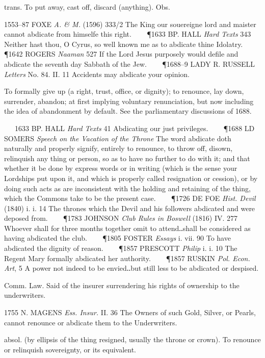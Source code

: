 \begin{description}[wide, labelwidth=!, labelindent=0pt]
\begin{myenumerate}
 trans. To put away, cast off, discard (anything). Obs. 

1553–87 FOXE \textit{A. \& M.} (1596) 333/2 The King our souereigne lord and 
maister cannot abdicate from himselfe this right.    
\P 1633 BP. HALL \textit{Hard Texts} 343 Neither hast thou, O Cyrus, so 
well known me as to abdicate thine Idolatry.    
\P 1642 ROGERS \textit{Naaman} 527 If the Lord Jesus purposely would defile 
and abdicate the seventh day Sabbath of the Jew.    
\P 1688–9 LADY R. RUSSELL \textit{Letters} No. 84. II. 11 Accidents may 
abdicate your opinion.

 To formally give up (a right, trust, office, or dignity); to 
renounce, lay down, surrender, abandon; at first implying voluntary 
renunciation, but now including the idea of abandonment by default. See 
the parliamentary discussions of 1688. 

   1633 BP. HALL \textit{Hard Texts} 41 Abdicating our just privileges.    
\P 1688 LD SOMERS \textit{Speech on the Vacation of the Throne} The word 
abdicate doth naturally and properly signify, entirely to renounce, to 
throw off, disown, relinquish any thing or person, so as to have no further 
to do with it; and that whether it be done by express words or in writing 
(which is the sense your Lordships put upon it, and which is properly called 
resignation or cession), or by doing such acts as are inconsistent with the 
holding and retaining of the thing, which the Commons take to be the present 
case.    
\P 1726 DE FOE \textit{Hist. Devil} (1840) i. i. 14 The thrones which the 
Devil and his followers abdicated and were deposed from.    
\P 1783 JOHNSON \textit{Club Rules in Boswell} (1816) IV. 277 Whoever shall 
for three months together omit to attend‥shall be considered as having 
abdicated the club.    
\P 1805 FOSTER \textit{Essays} i. vii. 90 To have abdicated the dignity of 
reason.    
\P 1857 PRESCOTT \textit{Philip} i. i. 10 The Regent Mary formally abdicated 
her authority.    
\P 1857 RUSKIN \textit{Pol. Econ. Art}, 5 A power not indeed to be envied‥but 
still less to be abdicated or despised.

 Comm. Law. Said of the insurer surrendering his rights of ownership 
to the underwriters. 

1755 N. MAGENS \textit{Ess. Insur.} II. 36 The Owners of such Gold, Silver, 
or Pearls, cannot renounce or abdicate them to the Underwriters.

 absol. (by ellipsis of the thing resigned, usually the throne or 
crown). To renounce or relinquish sovereignty, or its equivalent. 


\end{myenumerate}
\end{description}
